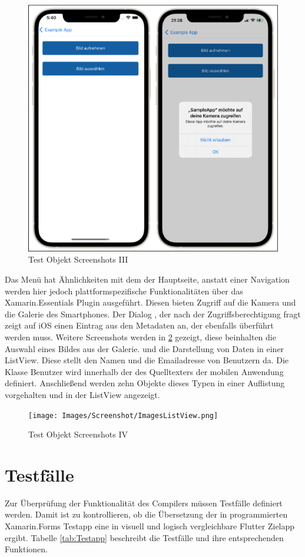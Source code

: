 \newpage 
\begin{figure}[!ht]
 \includegraphics[width=\textwidth,keepaspectratio]{Images/Screenshot/Permissions.png}
 \caption{Test Objekt Screenshots III}
 \label{fig:TestObjectIII}
\end{figure}
Das Menü hat Ähnlichkeiten mit dem der Hauptseite,  anstatt einer Navigation werden hier jedoch plattformspezifische Funktionalitäten über das Xamarin.Essentials Plugin ausgeführt.  Diesen bieten Zugriff auf die Kamera und die Galerie des Smartphones.  Der Dialog , der nach der Zugriffsberechtigung fragt zeigt auf iOS einen Eintrag aus den Metadaten an,  der ebenfalls überführt werden muss.  
Weitere Screenshots werden in \ref{fig:TestObjectIV} gezeigt,  diese beinhalten die Auswahl eines Bildes aus der Galerie. und die Darstellung von Daten in einer ListView.  Diese stellt den Namen und die Emailadresse von  Benutzern da.  Die Klasse Benutzer wird innerhalb der des Quelltexters der mobilen Anwendung definiert.  Anschließend werden zehn Objekte dieses Typen in einer Auflistung vorgehalten und in der ListView angezeigt.
\newpage 
\begin{figure}[!ht]
 \texttt{[image: Images/Screenshot/ImagesListView.png]}
 \caption{Test Objekt Screenshots IV}
 \label{fig:TestObjectIV}
\end{figure}


\section{Testfälle}
Zur Überprüfung der Funktionalität des Compilers müssen Testfälle definiert werden. Damit ist zu 
kontrollieren, ob die Übersetzung der in \Csharp{} programmierten  Xamarin.Forms Testapp eine in 
visuell und logisch vergleichbare Flutter Zielapp ergibt.  Tabelle \ref{tab:Testapp} beschreibt die Testfälle und ihre entsprechenden Funktionen.


